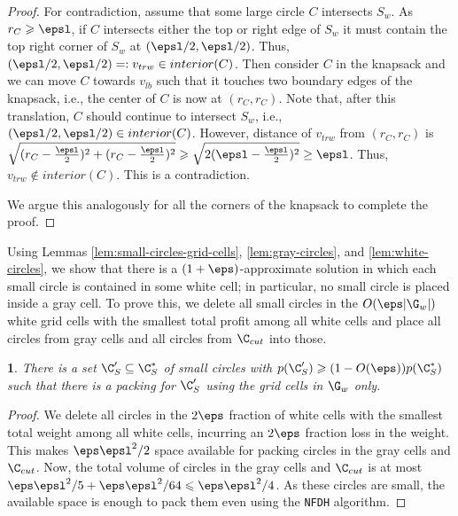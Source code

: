 \documentclass[10pt,a4paper]{article}
\theoremstyle{plain}
\theoremstyle{plain}
\newtheorem{lem}[theorem]{\protect\lemmaname}
\theoremstyle{plain}
\theoremstyle{definition}
\providecommand{\lemmaname}{Lemma}
\begin{document}
{\begin{proof}
	For contradiction, assume that some large circle $C$ intersects $S_w$. As $r_C \geqslant \epsl$, if $C$ intersects either the top or right edge of $S_w$ it must contain the top right corner of $S_w$ at $(\epsl/2, \epsl/2)$.  Thus, $(\epsl/2, \epsl/2)=: v_{trw} \in interior(C)$. 
	Then consider $C$ in the knapsack and we can move $C$ towards $v_{lb}$  such that it touches two boundary edges of the knapsack, i.e.,  the center of $C$ is now at $(r_C, r_C)$. Note that, after this translation, $C$ should continue to intersect $S_w$, i.e.,  $(\epsl/2, \epsl/2) \in interior(C)$. 
	However, distance of $v_{trw}$ from $(r_C, r_C)$ is $\sqrt{(r_C-\frac{\epsl}{2})^2 + (r_C-\frac{\epsl}{2})^2} \geqslant \sqrt{2(\epsl-\frac{\epsl}{2})^2} \ge \epsl$.
	Thus,  $v_{trw} \notin interior(C)$. This is a contradiction. 
	
	We argue this analogously for all the corners of the knapsack to complete the proof. 
\end{proof}


Using Lemmas \ref{lem:small-circles-grid-cells}, \ref{lem:gray-circles},
and \ref{lem:white-circles}, we show that there is a $(1+\eps)$-approximate
solution in which each small circle is contained in some white cell;
in particular, no small circle is placed inside a gray cell. To prove
this, we delete all small circles in the $O(\eps |\G_w|)$ white grid
cells with the smallest total profit among all white cells and place all circles from gray cells and
all circles from $\C_{cut}$ into those.

\begin{lem}%
	\label{lem:small-circles-white-grid-cells-1}
	There is a set $\C'_S \subseteq \C^*_S$ of small circles with $p(\C'_S)\geqslant (1-O(\eps)) p(\C^*_S)$ such that there is a packing for $\C'_S$ using the grid cells in $\G_w$ only.
	\end{lem}

\begin{proof}
	We delete all circles in the $2\eps$ fraction of white cells with the smallest total
	weight among all white cells, incurring an $2\eps$ fraction loss in the weight.
	This makes $\eps \epsl^2/2$ space available for packing circles in the gray cells and $\C_{cut}$.
	Now, the total volume of circles in the gray cells and $\C_{cut}$ is at most  $\eps \epsl^2/5 + \eps \epsl^2/64 \leqslant \eps \epsl^2/4$. As these circles are small, the available space is enough to pack them even using the \texttt{NFDH} algorithm. 


\end{proof}}
\end{document}
